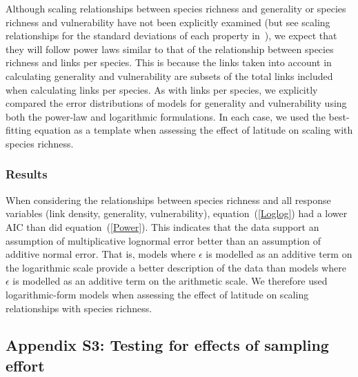\documentclass[12pt]{article}
\begin{document}
    Although scaling relationships between species richness and generality or
    species richness and vulnerability have not been explicitly examined (but see scaling 
    relationships for the standard deviations of each property in~\cite{Riede2010}), we expect that they will follow
    power laws similar to that of the relationship between species richness and links per species.
    This is because the links taken into account in calculating generality and vulnerability are subsets 
    of the total links included when calculating links per species. As with links per species, we explicitly 
    compared the error distributions of models for generality and vulnerability using
    both the power-law and logarithmic formulations. 
    In each case, we used the best-fitting equation as a template when assessing the effect of latitude on scaling with
    species richness. 


  \subsubsection*{Results}

    When considering the relationships between species richness and all response variables 
    (link density, generality, vulnerability), equation~(\ref{Loglog}) had a
    lower AIC than did equation~(\ref{Power}). This indicates that the
    data support an assumption of multiplicative lognormal error better than an
    assumption of additive normal error. That is, models where $\epsilon$ is
    modelled as an additive term on
    the logarithmic scale provide a better description of the data than models
    where $\epsilon$ is modelled as an additive term on the arithmetic scale.  
    We therefore used logarithmic-form models when assessing the
    effect of latitude on scaling relationships  with species richness.

\newpage

\subsection*{Appendix S3: Testing for effects of sampling effort}
\end{document}
